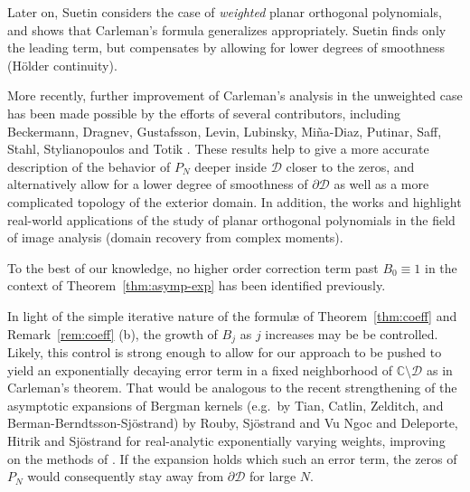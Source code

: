 \documentclass{amsart}
\newcommand{\C}{\mathbb{C}}
\newcommand{\calD}{\mathcal{D}}
\theoremstyle{definition}
\theoremstyle{remark}
\numberwithin{equation}{subsection}
\begin{document}
Later on, Suetin considers the case of {\em weighted}
planar orthogonal polynomials, 
and shows that Carleman's formula generalizes appropriately. 
Suetin finds only the leading term, but compensates 
by allowing for lower degrees of smoothness (H{\"o}lder continuity).

More recently, further improvement of
Carleman's analysis in the unweighted 
case has been made possible by the efforts of several 
contributors, including
Beckermann, Dragnev, Gustafsson, 
Levin, Lubinsky, Mi\~na-Diaz, Putinar, Saff, Stahl, 
Stylianopoulos and Totik
\cite{Beckermann, DMD2, Archipelago, Levin, Lubinsky,
MD1, Saff, Styl1}.
These results help to
give a more accurate description
of the behavior of $P_N$ deeper inside 
$\calD$ closer to the zeros,
and alternatively allow for a lower
degree of smoothness of $\partial\calD$ as well
as a more 
complicated topology of the
exterior domain. In addition,
the works \cite{Archipelago} and \cite{Saff}
highlight real-world applications of 
the study of planar orthogonal
polynomials
in the field of image analysis 
(domain recovery from complex moments).

To the best of our knowledge, no higher order correction term
past $B_0\equiv 1$ in the context of Theorem~\ref{thm:asymp-exp}
has been identified previously.



In light of the simple iterative nature of the
formul\ae{} of Theorem~\ref{thm:coeff}
and Remark~\ref{rem:coeff} {\rm (b)}, the growth of $B_j$
as $j$ increases may be be controlled. Likely, this
control is strong enough to allow
for our approach to be pushed to yield an exponentially
decaying error term in a fixed neighborhood of $\C\setminus\calD$
as in Carleman's theorem. That would be analogous to the 
recent strengthening of the asymptotic expansions of Bergman kernels
(e.g.\ by Tian, Catlin, Zelditch, and 
Berman-Berndtsson-Sj{\"o}strand) by
Rouby, Sj{\"o}strand and Vu Ngoc \cite{RSN} and 
Deleporte, Hitrik and Sj{\"o}strand \cite{DHS} for
real-analytic exponentially varying weights, improving
on the methods of \cite{BBS}.
If the expansion holds which such an error term,
the zeros of $P_N$ would consequently
stay away from $\partial\calD$ for large $N$. 
\end{document}
